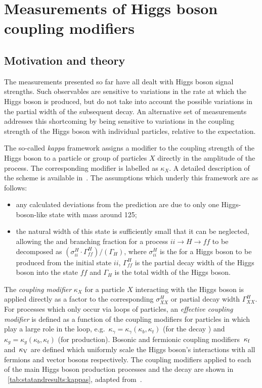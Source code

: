 \section{Measurements of Higgs boson coupling modifiers}
\label{sec:statandresults:kappas}
\subsection{Motivation and theory}

The measurements presented so far have all dealt with Higgs boson signal strengths. Such observables are sensitive to variations in the rate at which the Higgs boson is produced, but do not take into account the possible variations in the partial width of the subsequent decay. An alternative set of measurements addresses this shortcoming by being sensitive to variations in the coupling strength of the Higgs boson with individual particles, relative to the \SM expectation. 

The so-called \emph{kappa} framework assigns a modifier to the coupling strength of the Higgs boson to a particle or group of particles $X$ directly in the amplitude of the process. The corresponding modifier is labelled as $\kappa_{X}$. A detailed description of the scheme is available in~\cite{Khachatryan:2016vau}. 
The assumptions which underly this framework are as follows: 
\begin{itemize}
\item any calculated deviations from the \SM prediction are due to only one Higgs-boson-like state with mass around 125\GeV;
\item the natural width of this state is sufficiently small that it can be neglected, allowing the \crosssection and branching fraction for a process $ii\rightarrow H \rightarrow ff$ to be decomposed as $(\sigma_{ii}^{H} \cdot \Gamma_{ff}^{H}) / (\Gamma_H)$, where $\sigma_{ii}^{H}$ is the \crosssection for a Higgs boson to be produced from the initial state $ii$, $\Gamma^{H}_{ff}$ is the partial decay width of the Higgs boson into the state $ff$ and $\Gamma_{H}$ is the total width of the Higgs boson.
\end{itemize}

The \emph{coupling modifier} $\kappa_{X}$ for a particle $X$ interacting with the Higgs boson is applied directly as a factor to the corresponding \crosssection $\sigma_{XX}^{H}$ or partial decay width $\Gamma^{H}_{XX}$. For processes which only occur via loops of particles, an \emph{effective coupling modifier} is defined as a function of the coupling modifiers for particles in which play a large role in the loop, e.g.~$\kappa_{\gamma} = \kappa_{\gamma}(\kappa_b, \kappa_t) $ (for the decay \Hgg) and $\kappa_{g} = \kappa_{g}(\kappa_b, \kappa_t) $ (for \ggH production).
Bosonic and fermionic coupling modifiers $\,\kappa_\text{f}$ and $\,\kappa_\text{V}$ are defined which uniformly scale the Higgs boson's interactions with all fermions and vector bosons respectively. The coupling modifiers applied to each of the main Higgs boson production processes and the \Hgg decay are shown in \Table~\ref{tab:statandresults:kappas}, adapted from~\cite{Khachatryan:2016vau}.

